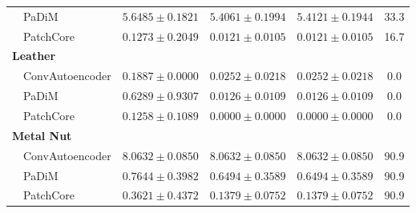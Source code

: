 \begin{table}[t]
\begin{tabular}{llcccc}
 & PaDiM & $5.6485 \pm 0.1821$ & $5.4061 \pm 0.1994$ & $5.4121 \pm 0.1944$ & 33.3 \\
 & PatchCore & $0.1273 \pm 0.2049$ & $0.0121 \pm 0.0105$ & $0.0121 \pm 0.0105$ & 16.7 \\
\midrule
\multicolumn{6}{l}{\textbf{Leather}} \\
 & ConvAutoencoder & $0.1887 \pm 0.0000$ & $0.0252 \pm 0.0218$ & $0.0252 \pm 0.0218$ & 0.0 \\
 & PaDiM & $0.6289 \pm 0.9307$ & $0.0126 \pm 0.0109$ & $0.0126 \pm 0.0109$ & 0.0 \\
 & PatchCore & $0.1258 \pm 0.1089$ & $0.0000 \pm 0.0000$ & $0.0000 \pm 0.0000$ & 0.0 \\
\midrule
\multicolumn{6}{l}{\textbf{Metal Nut}} \\
 & ConvAutoencoder & $8.0632 \pm 0.0850$ & $8.0632 \pm 0.0850$ & $8.0632 \pm 0.0850$ & 90.9 \\
 & PaDiM & $0.7644 \pm 0.3982$ & $0.6494 \pm 0.3589$ & $0.6494 \pm 0.3589$ & 90.9 \\
 & PatchCore & $0.3621 \pm 0.4372$ & $0.1379 \pm 0.0752$ & $0.1379 \pm 0.0752$ & 90.9 \\
\bottomrule
\end{tabular}
\end{table}
